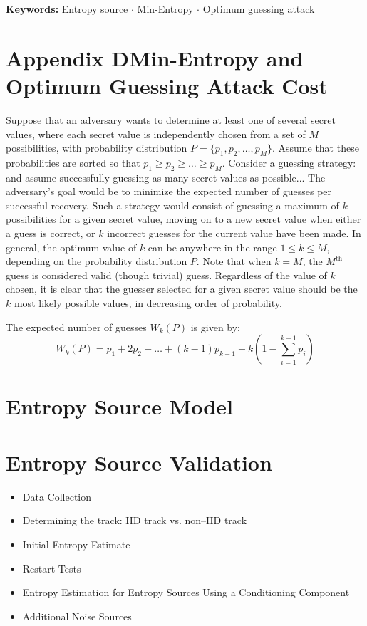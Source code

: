 \documentclass[12pt,openany]{book}
\theoremstyle{definition}
\begin{document}
\textbf{Keywords:} Entropy source $\cdot$ Min-Entropy $\cdot$ Optimum guessing attack

\section*{Appendix D\textendash Min-Entropy and Optimum Guessing Attack Cost}

Suppose that an adversary wants to determine at least one of several secret values, where each secret value is independently chosen from a set of \(M\) possibilities, with probability distribution \(P = \{p_1, p_2, \ldots, p_M\}\). Assume that these probabilities are sorted so that \(p_1 \geq p_2 \geq \ldots \geq p_M\). Consider a guessing strategy: and assume successfully guessing as many secret values as possible... The adversary's goal would be to minimize the expected number of guesses per successful recovery. Such a strategy would consist of guessing a maximum of \(k\) possibilities for a given secret value, moving on to a new secret value when either a guess is correct, or \(k\) incorrect guesses for the current value have been made. In general, the optimum value of \(k\) can be anywhere in the range \(1 \leq k \leq M\), depending on the probability distribution \(P\). Note that when \(k = M\), the \(M^{\text{th}}\) guess is considered valid (though trivial) guess. Regardless of the value of \(k\) chosen, it is clear that the guesser selected for a given secret value should be the \(k\) most likely possible values, in decreasing order of probability.

The expected number of guesses \(W_k(P)\) is given by:
\[
W_k(P) = p_1 + 2p_2 + \ldots + (k - 1)p_{k-1} + k \left( 1 - \sum_{i=1}^{k-1} p_i \right)
\]

\section*{Entropy Source Model}


\section*{Entropy Source Validation}
\begin{itemize}
	\item Data Collection
	\item Determining the track: IID track vs. non--IID track
	\item Initial Entropy Estimate
	\item Restart Tests
	\item Entropy Estimation for Entropy Sources Using a Conditioning Component
	\item Additional Noise Sources
\end{itemize}
\end{document}
